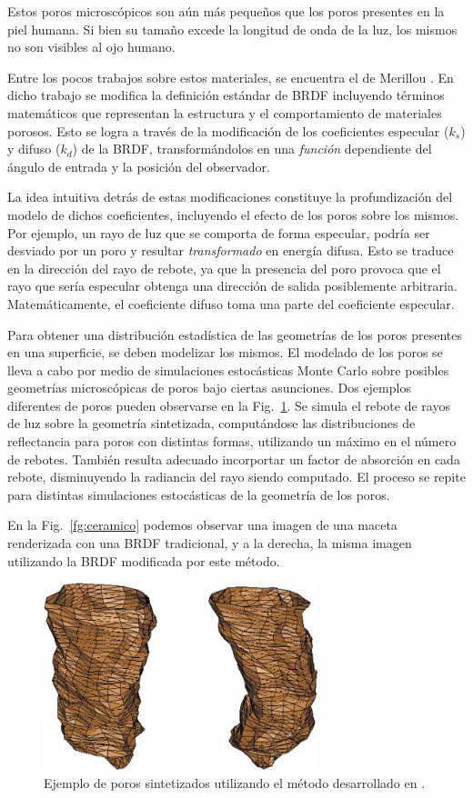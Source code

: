 Estos poros microscópicos son aún más pequeños que los poros presentes en la piel humana.
Si bien su tamaño excede la longitud de onda de la luz, los mismos no son visibles al ojo humano.

Entre los pocos trabajos sobre estos materiales, se encuentra el de Merillou \cite{Merillou2000}.
En dicho trabajo se modifica la definición estándar de BRDF incluyendo términos matemáticos que representan la estructura y el comportamiento de materiales porosos.
Esto se logra a través de la modificación de los coeficientes especular ($k_{s}$) y difuso ($k_{d}$) de la BRDF, transformándolos en una {\em función} dependiente del ángulo de entrada y la posición del observador.

La idea intuitiva detrás de estas modificaciones constituye la profundización del modelo de dichos coeficientes, incluyendo el efecto de los poros sobre los mismos.
Por ejemplo, un rayo de luz que se comporta de forma especular, podría ser desviado por un poro y resultar {\em transformado} en energía difusa.
Esto se traduce en la dirección del rayo de rebote, ya que la presencia del poro provoca que el rayo que sería especular obtenga una dirección de salida posiblemente arbitraria.
Matemáticamente, el coeficiente difuso toma una parte del coeficiente especular.

Para obtener una distribución estadística de las geometrías de los poros presentes en una superficie, se deben modelizar los mismos.
El modelado de los poros se lleva a cabo por medio de simulaciones estocásticas Monte Carlo sobre posibles geometrías microscópicas de poros bajo ciertas asunciones.
Dos ejemplos diferentes de poros pueden observarse en la Fig.~\ref{fg:poro}.
Se simula el rebote de rayos de luz sobre la geometría sintetizada, computándose las distribuciones de reflectancia para poros con distintas formas, utilizando un máximo en el número de rebotes.
También resulta adecuado incorportar un factor de absorción en cada rebote, disminuyendo la radiancia del rayo siendo computado.
El proceso se repite para distintas simulaciones estocásticas de la geometría de los poros.


En la Fig.~\ref{fg:ceramico} podemos observar una imagen de una maceta renderizada con una BRDF tradicional, y a la derecha, la misma imagen utilizando la BRDF modificada por este método.

\begin{figure}
\center
\includegraphics[width=8cm]{figures/poro}
\caption[Poros sinterizados]{Ejemplo de poros sintetizados utilizando el método desarrollado en \cite{Merillou2000}.}
\label{fg:poro}
\end{figure}

